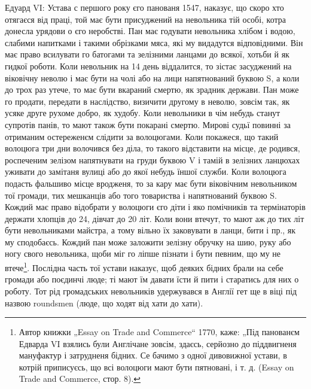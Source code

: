 Едуард VI: Устава с першого року єго панованя 1547, наказує, що скоро хто
отягаєся від праці, той має бути присуджений на невольника тій особі, котра
донесла урядови о єго неробстві. Пан має годувати невольника хлібом і водою,
слабими напитками і такими обрізками мяса, які му видадутся відповідними. Він
має право всилувати го батогами 
та зелізними ланцами до всякої, хотьби й як гидкої роботи. Коли невольник на 14
день віддалится, то зістає засуджений на віковічну неволю і має бути на чолі
або на лици напятнований буквою S, а коли до трох раз утече, то має бути
вкараний смертю, як зрадник держави. Пан може го продати, передати в наслідство,
визичити другому в неволю, зовсім так, як усяке друге рухоме добро, як худобу.
Коли невольники в чім небудь станут супротів панів, то мают також бути покарані
смертю. Мирові судьї повинні за отриманим остереженєм слідити за волоцюгами.
Коли покажеся, що такий волоцюга три дни волочився без діла, то такого
відставити на місце, де родився, роспеченим зелізом напятнувати на груди буквою
V і тамій в зелізних ланцюхах уживати до замітаня вулиці або до якої небудь
їншої служби. Коли волоцюга подасть фальшиво місце вродженя, то за кару має
бути віковічним невольником тої громади, тих мешканців або того товариства і
напятнований буквою S. Кождий має право відобрати у волоцюги єго діти і яко
помічників та термінаторів держати хлопців до 24, дівчат до 20 літ. Коли вони
втечут, то мают аж до тих літ бути невольниками майстра, а тому вільно їх
заковувати в ланци, бити і пр., як му сподобаєсь. Кождий пан може заложити
зелізну обручку на шию, руку або ногу свого невольника, щоби міг го ліпше
пізнати і бути певним, що му не втече\footnote{
Автор книжки „Essay on Trade and Commerce“ 1770, каже: „Під панованєм Едварда
VI взялись були Англічане зовсім, здаєсь, серйозно до піддвигненя мануфактур і
затрудненя бідних. Се бачимо з одної дивовижної устави, в котрій приписуєсь, що
всі волоцюги мают бути пятновані, і т. д. (Essay on Trade and Commerce, стор.
8).
}. Послідна часть тої устави наказує, щоб
деяких бідних брали на себе громади або поєдинчі люде; ті мают їм давати їсти
й пити і старатись для них о роботу. Тот рід громадських невольників удержувався
в Англії гет ще в  віці під назвою roundsmen (люде, що ходят від хати до
хати).

